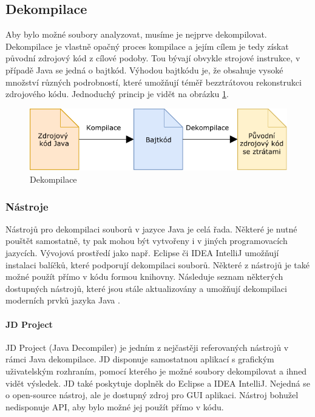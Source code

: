 		\subsection{Dekompilace}
			Aby bylo možné soubory analyzovat, musíme je nejprve dekompilovat. Dekompilace je vlastně opačný proces kompilace a jejím cílem je tedy získat původní zdrojový kód z cílové podoby. Tou bývají obvykle strojové instrukce, v případě Java se jedná o bajtkód. Výhodou bajtkódu je, že obsahuje vysoké množství různých podrobností, které umožňují téměř bezztrátovou rekonstrukci zdrojového kódu. Jednoduchý princip je vidět na obrázku \ref{decompilation}.
			
			\begin{figure}[!htb]
					\centering
					\includegraphics{img/decompilation.pdf}
					\caption[decompilation]{Dekompilace}
					\label{decompilation}
				\endminipage\hfill
			\end{figure}
			
			\subsubsection{Nástroje}
				Nástrojů pro dekompilaci souborů v jazyce Java je celá řada. Některé je nutné pouštět samostatně, ty pak mohou být vytvořeny i v jiných programovacích jazycích. Vývojová prostředí jako např. Eclipse či IDEA IntelliJ umožňují instalaci balíčků, které podporují dekompilaci souborů. Některé z nástrojů je také možné použít přímo v kódu formou knihovny. Následuje seznam některých dostupných nástrojů, které jsou stále aktualizovány a umožňují dekompilaci moderních prvků jazyka Java \cite{top8decompilers}\cite{decompilersOnline}\cite{quickDecompilers}.	
				
				\paragraph{JD Project}
					JD Project (Java Decompiler) \cite{jd} je jedním z nejčastěji referovaných nástrojů v rámci Java dekompilace. JD disponuje samostatnou aplikací s grafickým uživatelským rozhraním, pomocí kterého je možné soubory dekompilovat a ihned vidět výsledek. JD také poskytuje doplněk do Eclipse a IDEA IntelliJ. Nejedná se o open-source nástroj, ale je dostupný zdroj pro GUI aplikaci. Nástroj bohužel nedisponuje API, aby bylo možné jej použít přímo v kódu.
					
